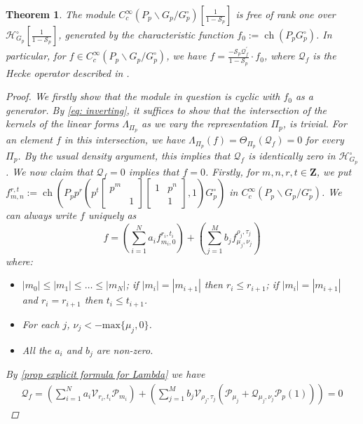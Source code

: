 \documentclass{amsart}%
\theoremstyle{plain}
\newtheorem{thm}{Theorem}[subsection]
\theoremstyle{plain}
\theoremstyle{remark}
\DeclareMathOperator{\ch}{ch}
\begin{document}
\begin{thm}
     The module $C_c^\infty(P_p\backslash G_p/G_p^\circ)[\tfrac{1}{1-\mathcal{S}_p}]$ is free of rank one over $\mathcal{H}_{G_p}^\circ[\tfrac{1}{1-\mathcal{S}_p}]$, generated by the characteristic function $f_0:=\ch(P_pG_p^\circ)$. In particular, for $f\in C_c^\infty(P_p\backslash G_p/G_p^\circ)$, we have $f=\tfrac{-\mathcal{S}_p\mathcal{Q}_f^{'}}{1-\mathcal{S}_p}\cdot f_0$, where $\mathcal{Q}_f$ is the Hecke operator described in \emph{}.
    \begin{proof} We firstly show that the module in question is cyclic with $f_0$ as a generator.
        By \eqref{eq: inverting}, it suffices to show that the intersection of the kernels of the linear forms $\Lambda_{\Pi_p}$ as we vary the representation $\Pi_p$, is trivial. For an element $f$ in this intersection, we have $\Lambda_{\Pi_p}(f)=\Theta_{\Pi_p}(\mathcal{Q}_f)=0$ for every $\Pi_p$. By the usual density argument, this implies that $\mathcal{Q}_f$ is identically zero in $\mathcal{H}_{G_p}^\circ$. We now claim that $\mathcal{Q}_f=0$ implies that $f=0$. Firstly, for $m,n,r,t\in\mathbf{Z}$,  we put $f_{m,n}^{r,t}:=\ch\left(P_p p^r\left(p^t\left[\begin{smallmatrix}
            p^m & \\
            & 1
        \end{smallmatrix}\right]\left[\begin{smallmatrix}
            1 & p^{n}\\
            & 1
        \end{smallmatrix}\right],1\right) G_p^\circ\right)$ in $C_c^\infty(P_p\backslash G_p/G_p^\circ)$. We can always write $f$ uniquely as 
        $$f=\left(\sum_{i=1}^N a_i f_{m_i,0}^{r_i,t_i}\right)+\left(\sum_{j=1}^M b_j f_{\mu_j,\nu_j}^{\rho_j,\tau_j}\right)$$
        where:
        \begin{itemize}
            \item $|m_0|\leq |m_1|\leq  \dots \leq |m_N| $; if $|m_i|=|m_{i+1}|$ then $r_i\leq r_{i+1}$; if $|m_i|=|m_{i+1}|$ and $r_i=r_{i+1}$ then $t_i\leq t_{i+1}$.
            \item For each $j$, $\nu_j<-\mathrm{max}\{\mu_j,0\}$. 
            \item All the $a_i$ and $b_j$ are non-zero.
        \end{itemize}
        By \cref{prop explicit formula for Lambda} we have 
        \begin{align}\label{eq:18}
            \mathcal{Q}_f=\left(\sum_{i=1}^N a_i\mathscr{V}_{r_i,t_i}\mathscr{P}_{m_i}\right)+\left(\sum_{j=1}^M b_j \mathscr{V}_{\rho_j,\tau_j}\left(\mathscr{P}_{\mu_j}+\mathscr{Q}_{\mu_j,\nu_j}\mathcal{P}_p(1)\right)\right)=0

\end{align}
\end{proof}
\end{thm}
\end{document}
